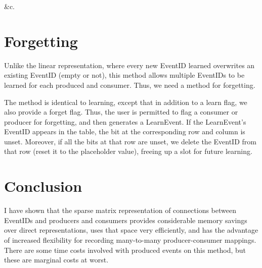 \documentclass[11pt]{article}
\begin{document}
\&c.

\section{Forgetting}

Unlike the linear representation, where every new EventID learned overwrites an existing EventID (empty or not), this method allows multiple EventIDs to be learned for each produced and consumer. Thus, we need a method for forgetting.

The method is identical to learning, except that in addition to a learn flag, we also provide a forget flag. Thus, the user is permitted to flag a consumer or producer for forgetting, and then generates a LearnEvent. If the LearnEvent's EventID appears in the table, the bit at the corresponding row and column is unset. Moreover, if all the bits at that row are unset, we delete the EventID from that row (reset it to the placeholder value), freeing up a slot for future learning.

\section{Conclusion}

I have shown that the sparse matrix representation of connections between EventIDs and producers and consumers provides considerable memory savings over direct representations, uses that space very efficiently, and has the advantage of increased flexibility for recording many-to-many producer-consumer mappings. There are some time costs involved with produced events on this method, but these are marginal costs at worst.
\end{document}
